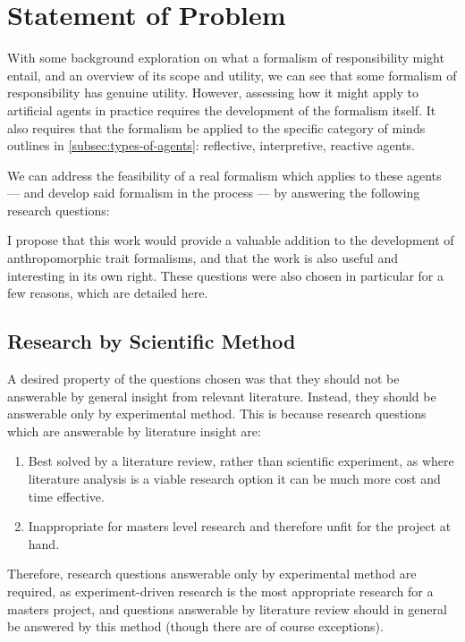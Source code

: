 \section{Statement of Problem}\label{sec:statement_of_problem}

With some background exploration on what a formalism of responsibility might entail, and an overview of its scope and utility, we can see that some formalism of responsibility has genuine utility. However, assessing how it might apply to artificial agents in practice requires the development of the formalism itself. It also requires that the formalism be applied to the specific category of minds outlines in \cref{subsec:types-of-agents}: reflective, interpretive, reactive agents. \par

We can address the feasibility of a real formalism which applies to these agents --- and develop said formalism in the process --- by answering the following research questions:



I propose that this work would provide a valuable addition to the development of anthropomorphic trait formalisms, and that the work is also useful and interesting in its own right. These questions were also chosen in particular for a few reasons, which are detailed here. \par

\subsection{Research by Scientific Method}

A desired property of the questions chosen was that they should not be answerable by general insight from relevant literature. Instead, they should be answerable only by experimental method. This is because research questions which are answerable by literature insight are:
\begin{enumerate}[label=\emph{\Alph*}:]
    \item Best solved by a literature review, rather than scientific experiment, as where literature analysis is a viable research option it can be much more cost and time effective.
    \item Inappropriate for masters level research and therefore unfit for the project at hand.
\end{enumerate}

Therefore, research questions answerable only by experimental method are required, as experiment-driven research is the most appropriate research for a masters project, and questions answerable by literature review should in general be answered by this method (though there are of course exceptions).\par

